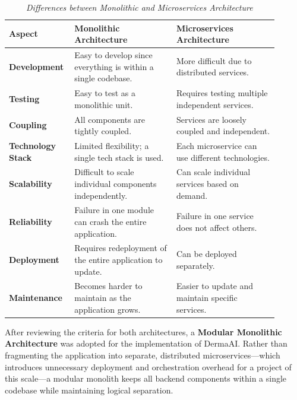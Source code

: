 \begin{table}[H]
	\centering
	\renewcommand{\arraystretch}{1.35}
	\begin{tabular}{|@{}>{\raggedright\arraybackslash}p{0.18\linewidth}|>{\raggedright\arraybackslash}p{0.36\linewidth}|>{\raggedright\arraybackslash}p{0.36\linewidth}@{}|}\hline
		
		\textbf{Aspect} & \textbf{Monolithic Architecture} & \textbf{Microservices Architecture} \\\hline
		
		\textbf{Development} & Easy to develop since everything is within a single codebase. & More difficult due to distributed services. \\\hline
		\textbf{Testing} & Easy to test as a monolithic unit. & Requires testing multiple independent services. \\\hline
		\textbf{Coupling} & All components are tightly coupled. & Services are loosely coupled and independent. \\\hline
		\textbf{Technology Stack} & Limited flexibility; a single tech stack is used. & Each microservice can use different technologies. \\\hline
		\textbf{Scalability} & Difficult to scale individual components independently. & Can scale individual services based on demand. \\\hline
		\textbf{Reliability} & Failure in one module can crash the entire application. & Failure in one service does not affect others. \\\hline
		\textbf{Deployment} & Requires redeployment of the entire application to update. & Can be deployed separately. \\\hline
		\textbf{Maintenance} & Becomes harder to maintain as the application grows. & Easier to update and maintain specific services. \\ \hline
		
	\end{tabular}
	\caption{\textit{Differences between Monolithic and Microservices Architecture}}
	\label{tab:arch_compare}
\end{table}

After reviewing the criteria for both architectures, a \textbf{Modular Monolithic Architecture} was adopted for the implementation of DermaAI. Rather than fragmenting the application into separate, distributed microservices—which introduces unnecessary deployment and orchestration overhead for a project of this scale—a modular monolith keeps all backend components within a single codebase while maintaining logical separation.

